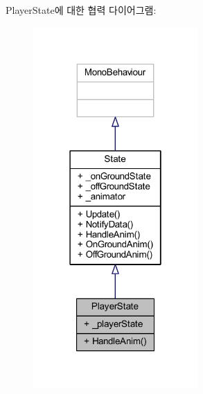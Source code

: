 Player\+State에 대한 협력 다이어그램\+:
\nopagebreak
\begin{figure}[H]
\begin{center}
\leavevmode
\includegraphics[width=178pt]{df/dfa/class_player_state__coll__graph}
\end{center}
\end{figure}
